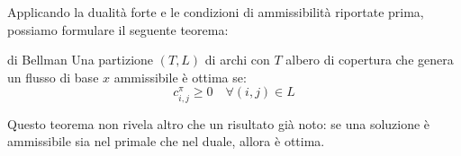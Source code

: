 \documentclass[a4paper,11pt]{article}
\begin{document}
Applicando la dualità forte e le condizioni di ammissibilità riportate prima, possiamo formulare il seguente teorema:
\begin{theorem}{di Bellman}
	Una partizione $(T, L)$ di archi con $T$ albero di copertura che genera un flusso di base $x$ ammissibile è ottima se:
	$$c^\pi_{i,j} \geq 0 \quad \forall (i, j) \in L$$
\end{theorem}

Questo teorema non rivela altro che un risultato già noto: se una soluzione è ammissibile sia nel primale che nel duale, allora è ottima.
\end{document}
